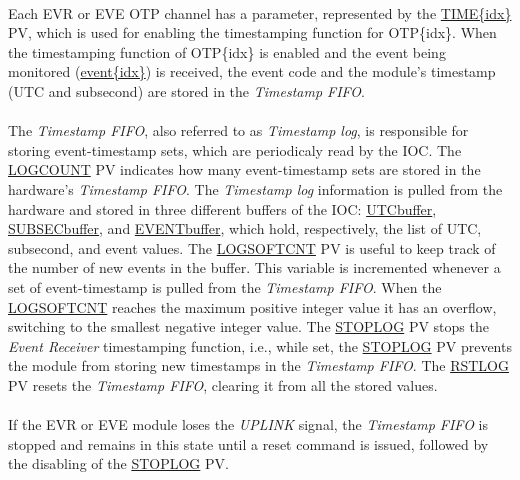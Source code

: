 \documentclass[openany]{article}
\begin{document}
		\paragraph{} Each EVR or EVE OTP channel has a parameter, represented by the \hyperref[pvgroup:evre-otp]{TIME\{idx\}} PV, which is used for enabling the timestamping function for OTP\{idx\}. When the timestamping function of OTP\{idx\} is enabled and the event being monitored (\hyperref[pvgroup:evre-otp]{event\{idx\}}) is received, the event code and the module's timestamp (UTC and subsecond) are stored in the \emph{Timestamp FIFO}.
		\paragraph{} The \emph{Timestamp FIFO}, also referred to as \emph{Timestamp log}, is responsible for storing event-timestamp sets, which are periodicaly read by the IOC. The \hyperref[pvgroup:evre-timestamp-log]{LOGCOUNT} PV indicates how many event-timestamp sets are stored in the hardware's \emph{Timestamp FIFO}. The \emph{Timestamp log} information is pulled from the hardware and stored in three different buffers of the IOC: \hyperref[pvgroup:evre-timestamp-log]{UTCbuffer}, \hyperref[pvgroup:evre-timestamp-log]{SUBSECbuffer}, and \hyperref[pvgroup:evre-timestamp-log]{EVENTbuffer}, which hold, respectively, the list of UTC, subsecond, and event values. The \hyperref[pvgroup:evre-timestamp-log]{LOGSOFTCNT} PV is useful to keep track of the number of new events in the buffer. This variable is incremented whenever a set of event-timestamp is pulled from the \emph{Timestamp FIFO}. When the \hyperref[pvgroup:evre-timestamp-log]{LOGSOFTCNT} reaches the maximum positive integer value it has an overflow, switching to the smallest negative integer value. The \hyperref[pvgroup:evre-timestamp-log]{STOPLOG} PV stops the \emph{Event Receiver} timestamping function, i.e., while set, the \hyperref[pvgroup:evre-timestamp-log]{STOPLOG} PV prevents the module from storing new timestamps in the \emph{Timestamp FIFO}. The \hyperref[pvgroup:evre-timestamp-log]{RSTLOG} PV resets the \emph{Timestamp FIFO}, clearing it from all the stored values.
		\paragraph{} If the EVR or EVE module loses the \emph{UPLINK} signal, the \emph{Timestamp FIFO} is stopped and remains in this state until a reset command is issued, followed by the disabling of the \hyperref[pvgroup:evre-timestamp-log]{STOPLOG} PV.
\end{document}
